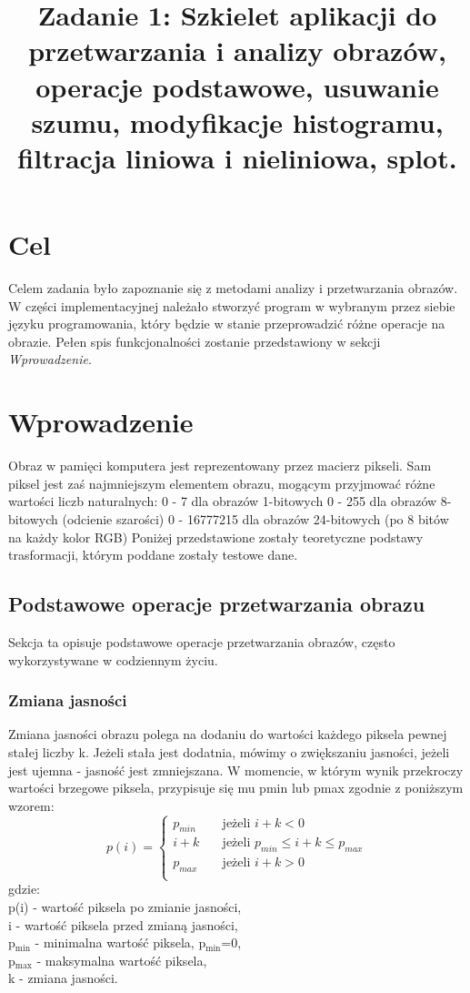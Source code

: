 \documentclass{classrep}
\author{
  \studentinfo{Jakub Antosik}{XXXXXX} \and
  \studentinfo{Andrzej Lisowski}{206087} 
}
\title{Zadanie 1: Szkielet aplikacji do przetwarzania i analizy obrazów, operacje podstawowe, usuwanie szumu,
modyfikacje histogramu, filtracja liniowa i nieliniowa, splot.}
\begin{document}
\maketitle

\section{Cel}
Celem zadania było zapoznanie się z metodami analizy i przetwarzania obrazów. W części implementacyjnej należało stworzyć program w wybranym przez siebie języku programowania, który będzie w stanie przeprowadzić różne operacje na obrazie. Pełen spis funkcjonalności zostanie przedstawiony w sekcji \textit{Wprowadzenie}.

\section{Wprowadzenie}
Obraz w pamięci komputera jest reprezentowany przez macierz pikseli. Sam piksel jest zaś najmniejszym elementem obrazu, mogącym przyjmować różne wartości liczb naturalnych:
0 - 7 dla obrazów 1-bitowych
0 - 255 dla obrazów 8-bitowych (odcienie szarości)
0 - 16777215 dla obrazów 24-bitowych (po 8 bitów na każdy kolor RGB)
Poniżej przedstawione zostały teoretyczne podstawy trasformacji, którym poddane zostały testowe dane.

\subsection{Podstawowe operacje przetwarzania obrazu}
Sekcja ta opisuje podstawowe operacje przetwarzania obrazów, często wykorzystywane w codziennym życiu.

\subsubsection{Zmiana jasności}
Zmiana jasności obrazu polega na dodaniu do wartości każdego piksela pewnej stałej liczby k. Jeżeli stała jest dodatnia, mówimy o zwiększaniu jasności, jeżeli jest ujemna - jasność jest zmniejszana. W momencie, w którym wynik przekroczy wartości brzegowe piksela, przypisuje się mu pmin lub pmax zgodnie z poniższym wzorem:
\[ p(i) =
  \begin{cases}
    p_{min} & \quad \text{jeżeli } i+k<0\\
    i + k  & \quad \text{jeżeli } p_{min} \leq i+k \leq p_{max}\\
    p_{max}  & \quad \text{jeżeli } i+k>0\\
  \end{cases}
\]
gdzie:\\
p(i) - wartość piksela po zmianie jasności,\\
i - wartość piksela przed zmianą jasności,\\
p$_{\text{min}}$ - minimalna wartość piksela, p$_{\text{min}}$=0,\\
p$_{\text{max}}$ - maksymalna wartość piksela,\\
k - zmiana jasności.\\
\end{document}
